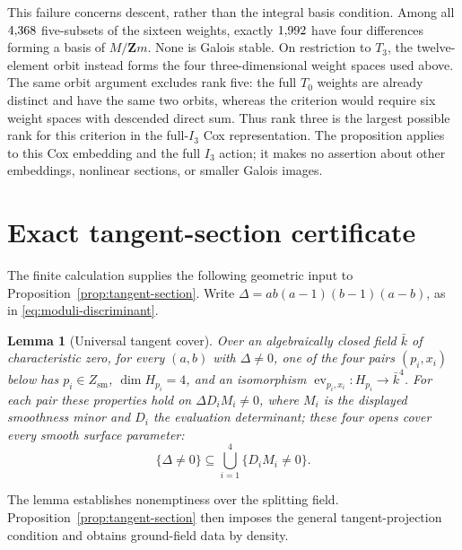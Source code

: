 \documentclass[11pt]{article}
\newtheorem{lemma}[theorem]{Lemma}
\theoremstyle{remark}
\newcommand{\Z}{\mathbf Z}
\begin{document}
This failure concerns descent, rather than the integral basis condition.
Among all \(4{,}368\) five-subsets of the sixteen weights,
exactly \(1{,}992\) have four differences forming a basis
of \(M/\Z m\).  None is Galois stable.  On restriction to \(T_3\), the
twelve-element orbit instead forms the four three-dimensional weight spaces
used above.  The same orbit argument excludes rank five: the full \(T_0\)
weights are already distinct and have the same two orbits, whereas the
criterion would require six weight spaces with descended direct sum.
Thus rank three is the largest possible rank for this criterion in the
full-\(I_3\) Cox representation.  The proposition applies to this Cox embedding and the full
\(I_3\) action; it makes no assertion about other embeddings, nonlinear
sections, or smaller Galois images.

\section{Exact tangent-section certificate}\label{sec:tangent-certificate}
\label{app:slice-certificate}

The finite calculation supplies the following geometric input to
Proposition~\ref{prop:tangent-section}. Write
\(\Delta=ab(a-1)(b-1)(a-b)\), as in
\eqref{eq:moduli-discriminant}.

\begin{lemma}[Universal tangent cover]\label{lem:universal-tangent-cover}
%
%
Over an algebraically closed field \(\bar k\) of characteristic zero, for every
\((a,b)\) with \(\Delta\ne0\), one of the four pairs \((p_i,x_i)\) below
has \(p_i\in Z_{\mathrm{sm}}\), \(\dim H_{p_i}=4\), and an isomorphism
\(\operatorname{ev}_{p_i,x_i}:H_{p_i}\to\bar k^4\).
For each pair these properties hold on \(\Delta D_iM_i\ne0\), where \(M_i\)
is the displayed smoothness minor and \(D_i\) the evaluation determinant;
these four opens cover every smooth surface parameter:
\begin{equation}
 \{\Delta\ne0\}\subseteq\bigcup_{i=1}^4\{D_iM_i\ne0\}.
 \label{eq:witness-cover}
\end{equation}
\end{lemma}

The lemma establishes nonemptiness over the splitting field.
Proposition~\ref{prop:tangent-section} then imposes the general
tangent-projection condition and obtains ground-field data by density.
\end{document}
